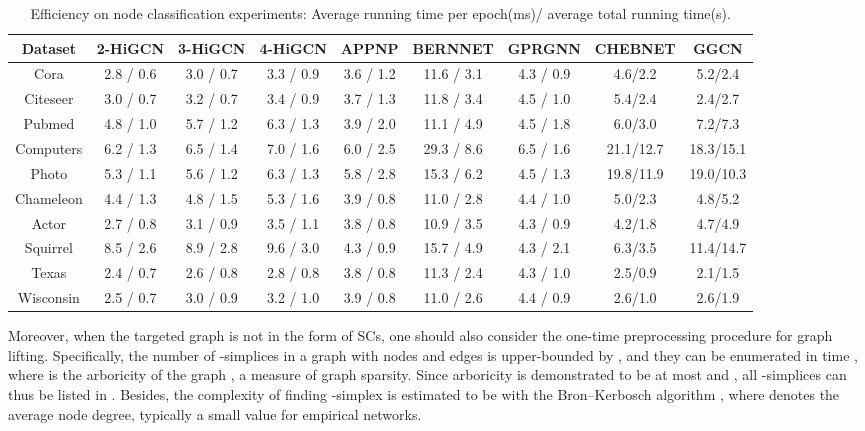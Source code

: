 \documentclass[letterpaper]{article} \usepackage{aaai24}
\theoremstyle{plain}
\theoremstyle{definition}
\theoremstyle{remark}
\begin{document}
\begin{table*}[!ht]
\centering
\begin{tabular}{ccccccccc}
\toprule
Dataset    & 2-HiGCN     & 3-HiGCN   & 4-HiGCN    & APPNP        & BERNNET     & GPRGNN       &CHEBNET     &GGCN \\
\midrule
Cora        & 2.8 / 0.6  & 3.0 / 0.7     & 3.3 / 0.9    &3.6 / 1.2   & 11.6 / 3.1  &4.3 / 0.9        &4.6/2.2  &5.2/2.4\\
Citeseer    & 3.0 / 0.7  & 3.2 / 0.7     & 3.4 / 0.9    &3.7 / 1.3   & 11.8 / 3.4  &4.5 / 1.0        &5.4/2.4  &2.4/2.7\\
Pubmed      & 4.8 / 1.0  & 5.7 / 1.2     & 6.3 / 1.3    &3.9 / 2.0   & 11.1 / 4.9  &4.5 / 1.8        &6.0/3.0  &7.2/7.3\\
Computers   & 6.2 / 1.3  & 6.5 / 1.4     & 7.0 / 1.6    &6.0 / 2.5   & 29.3 / 8.6  &6.5 / 1.6    &21.1/12.7  &18.3/15.1\\
Photo       & 5.3 / 1.1  & 5.6 / 1.2     & 6.3 / 1.3    &5.8 / 2.8   & 15.3 / 6.2  &4.5 / 1.3    &19.8/11.9  &19.0/10.3\\
\midrule
Chameleon   & 4.4 / 1.3  & 4.8 / 1.5     & 5.3 / 1.6    &3.9 / 0.8   & 11.0 / 2.8  &4.4 / 1.0   &5.0/2.3  &4.8/5.2\\
Actor       & 2.7 / 0.8  & 3.1 / 0.9     & 3.5 / 1.1    &3.8 / 0.8   & 10.9 / 3.5  &4.3 / 0.9   &4.2/1.8  &4.7/4.9\\
Squirrel    & 8.5 / 2.6  & 8.9 / 2.8     & 9.6 / 3.0    &4.3 / 0.9   & 15.7 / 4.9  &4.3 / 2.1   &6.3/3.5  &11.4/14.7\\
Texas       & 2.4 / 0.7  & 2.6 / 0.8     & 2.8 / 0.8    &3.8 / 0.8   & 11.3 / 2.4  &4.3 / 1.0   &2.5/0.9  &2.1/1.5\\
Wisconsin   & 2.5 / 0.7  & 3.0 / 0.9     & 3.2 / 1.0    &3.9 / 0.8   & 11.0 / 2.6  &4.4 / 0.9   &2.6/1.0  &2.6/1.9\\
\bottomrule
\end{tabular}\caption{Efficiency on node classification experiments: Average running time per epoch(ms)/ average total running time(s).}
\label{tab: runTime}
\end{table*}


Moreover, when the targeted graph is not in the form of SCs, one should also consider the one-time preprocessing procedure for graph lifting.
Specifically, the number of -simplices in a graph with  nodes and  edges is upper-bounded by , and they can be enumerated in  time \cite{chiba1985arboricity}, where  is the arboricity of the graph , a measure of graph sparsity.
Since arboricity is demonstrated to be at most  and , all -simplices can thus be listed in .
Besides, the complexity of finding -simplex is estimated to be  with the Bron–Kerbosch algorithm \cite{find_cliques1973}, where  denotes the average node degree, typically a small value for empirical networks.
\end{document}
